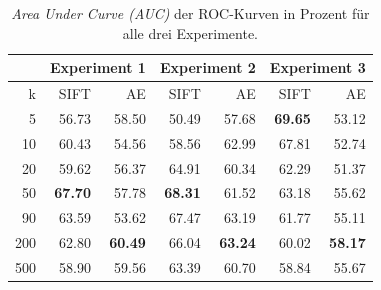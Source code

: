 
\begin{table}
\centering

\begin{tabular}[t]{|r|r|r|r|r|r|r|}
	\hline
       & \multicolumn{2}{|c|}{Experiment 1} & \multicolumn{2}{|c|}{Experiment 2} & \multicolumn{2}{|c|}{Experiment 3} \\ \hline
      k & SIFT    & AE      & SIFT    & AE      & SIFT    & AE      \\ \hline     
      5 & 56.73 & 58.50 & 50.49 & 57.68 & \textbf{69.65} & 53.12 \\ \hline
     10 & 60.43 & 54.56 & 58.56 & 62.99 & 67.81 & 52.74 \\ \hline
  	 20 & 59.62 & 56.37 & 64.91 & 60.34 & 62.29 & 51.37 \\ \hline
 	 50 & \textbf{67.70} & 57.78 & \textbf{68.31} & 61.52 & 63.18 & 55.62 \\ \hline
	 90 & 63.59 & 53.62 & 67.47 & 63.19 & 61.77 & 55.11 \\ \hline
	200 & 62.80 & \textbf{60.49} & 66.04 & \textbf{63.24} & 60.02 & \textbf{58.17} \\ \hline
	500 & 58.90 & 59.56 & 63.39 & 60.70 & 58.84 & 55.67 \\ \hline
\end{tabular}
\caption{\textit{Area Under Curve (AUC)} der ROC-Kurven in Prozent für alle drei Experimente.}
\label{tab:AUC}
\end{table}

